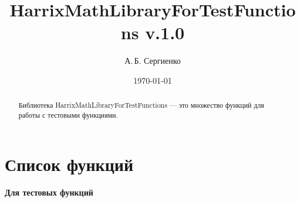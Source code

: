 \documentclass[a4paper,12pt]{article}
\title{HarrixMathLibraryForTestFunctions v.1.0}
\author{А.\,Б. Сергиенко}
\date{\today}
\begin{document}


\maketitle

\begin{abstract}
Библиотека HarrixMathLibraryForTestFunctions --- это множество функций для работы с тестовыми функциями.
\end{abstract}

\tableofcontents

\newpage

\newpage
\section{Список функций}\label{section_listfunctions}
\textbf{Для тестовых функций}
\end{document}
